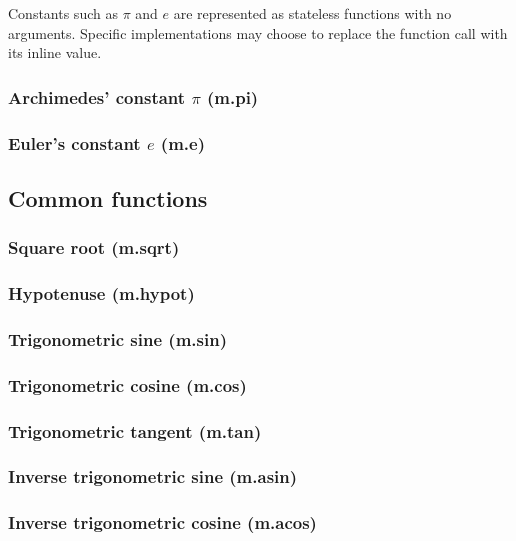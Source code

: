 \documentclass{article}
\theoremstyle{definition}
\begin{document}
Constants such as $\pi$ and $e$ are represented as stateless functions with no arguments.  Specific implementations may choose to replace the function call with its inline value.

\subsubsection{Archimedes' constant $\pi$ (m.pi)}

\subsubsection{Euler's constant $e$ (m.e)}

\subsection{Common functions}

\subsubsection{Square root (m.sqrt)}

\subsubsection{Hypotenuse (m.hypot)}

\subsubsection{Trigonometric sine (m.sin)}

\subsubsection{Trigonometric cosine (m.cos)}

\subsubsection{Trigonometric tangent (m.tan)}

\subsubsection{Inverse trigonometric sine (m.asin)}

\subsubsection{Inverse trigonometric cosine (m.acos)}
\end{document}
